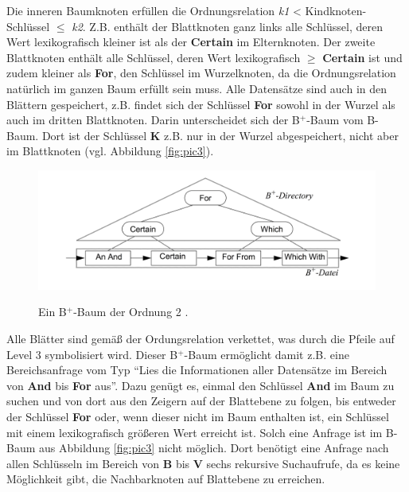 Die inneren Baumknoten erfüllen die Ordnungsrelation \textit{k1} < Kindknoten-Schlüssel $\leq$ \textit{k2}. Z.B. enthält der Blattknoten ganz links alle Schlüssel, deren Wert lexikografisch kleiner ist als der \textbf{Certain} im Elternknoten. Der zweite Blattknoten enthält alle Schlüssel, deren Wert lexikografisch $\geq$ \textbf{Certain} ist und zudem kleiner als \textbf{For}, den Schlüssel im Wurzelknoten, da die Ordnungsrelation natürlich im ganzen Baum erfüllt sein muss. Alle Datensätze sind auch in den Blättern gespeichert, z.B. findet sich der Schlüssel \textbf{For} sowohl in der Wurzel als auch im dritten Blattknoten. Darin unterscheidet sich der B$^+$-Baum vom B-Baum. Dort ist der Schlüssel \textbf{K} z.B. nur in der Wurzel abgespeichert, nicht aber im Blattknoten (vgl. Abbildung \ref{fig:pic3}).  
\begin{figure}[hpbt]
  \centering
  \includegraphics[width=1.0\textwidth]{pictures/b+baum.png}\\
  \caption[Ein B$^+$-Baum der Ordnung 2]{Ein B$^+$-Baum der Ordnung 2 \cite{Kriegel1994--2013}.}\label{fig:pic4}
\end{figure}
\noindent
Alle Blätter sind gemäß der Ordungsrelation verkettet, was durch die Pfeile auf Level 3 symbolisiert wird. Dieser B$^+$-Baum ermöglicht damit z.B. eine Bereichsanfrage vom Typ "`Lies die Informationen aller Datensätze im Bereich von \textbf{And} bis \textbf{For} aus"'. Dazu genügt es, einmal den Schlüssel \textbf{And} im Baum zu suchen und von dort aus den Zeigern auf der Blattebene zu folgen, bis entweder der Schlüssel \textbf{For} oder, wenn dieser nicht im Baum enthalten ist, ein Schlüssel mit einem lexikografisch größeren Wert erreicht ist. Solch eine Anfrage ist im B-Baum aus Abbildung \ref{fig:pic3} nicht möglich. Dort benötigt eine Anfrage nach allen Schlüsseln im Bereich von \textbf{B} bis \textbf{V} sechs rekursive Suchaufrufe, da es keine Möglichkeit gibt, die Nachbarknoten auf Blattebene zu erreichen. 
 
